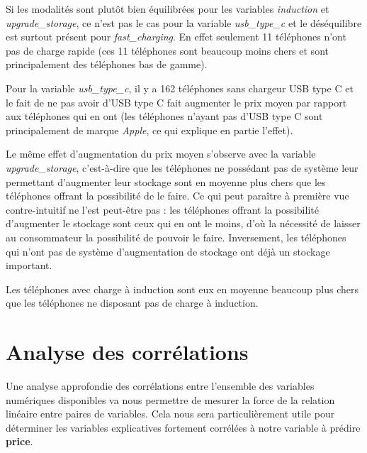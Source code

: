 \documentclass[
  12pt,
]{report}
\begin{document}
Si les modalités sont plutôt bien équilibrées pour les variables
\emph{induction} et \emph{upgrade\_storage}, ce n'est pas le cas pour la
variable \emph{usb\_type\_c} et le déséquilibre est surtout présent pour
\emph{fast\_charging}. En effet seulement 11 téléphones n'ont pas de
charge rapide (ces 11 téléphones sont beaucoup moins chers et sont
principalement des téléphones bas de gamme).

Pour la variable \emph{usb\_type\_c}, il y a 162 téléphones sans
chargeur USB type C et le fait de ne pas avoir d'USB type C fait
augmenter le prix moyen par rapport aux téléphones qui en ont (les
téléphones n'ayant pas d'USB type C sont principalement de marque
\emph{Apple}, ce qui explique en partie l'effet).

Le même effet d'augmentation du prix moyen s'observe avec la variable
\emph{upgrade\_storage}, c'est-à-dire que les téléphones ne possédant
pas de système leur permettant d'augmenter leur stockage sont en moyenne
plus chers que les téléphones offrant la possibilité de le faire. Ce qui
peut paraître à première vue contre-intuitif ne l'est peut-être pas :
les téléphones offrant la possibilité d'augmenter le stockage sont ceux
qui en ont le moins, d'où la nécessité de laisser au consommateur la
possibilité de pouvoir le faire. Inversement, les téléphones qui n'ont
pas de système d'augmentation de stockage ont déjà un stockage
important.

Les téléphones avec charge à induction sont eux en moyenne beaucoup plus
chers que les téléphones ne disposant pas de charge à induction.

\newpage

\section{Analyse des corrélations}\label{analyse-des-corruxe9lations}

Une analyse approfondie des corrélations entre l'ensemble des variables
numériques disponibles va nous permettre de mesurer la force de la
relation linéaire entre paires de variables. Cela nous sera
particulièrement utile pour déterminer les variables explicatives
fortement corrélées à notre variable à prédire \textbf{price}.
\end{document}
